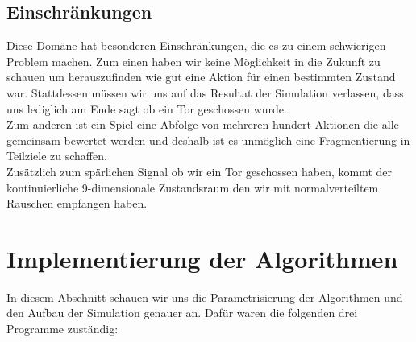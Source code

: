         \subsection{Einschränkungen}
            Diese Domäne hat besonderen Einschränkungen, die es zu einem schwierigen Problem machen. Zum einen haben wir keine Möglichkeit in die Zukunft zu schauen um herauszufinden wie gut eine Aktion für einen bestimmten Zustand war. Stattdessen müssen wir uns auf das Resultat der Simulation verlassen, dass uns lediglich am Ende sagt ob ein Tor geschossen wurde. \\[2mm]
            \noindent
            Zum anderen ist ein Spiel eine Abfolge von mehreren hundert Aktionen die alle gemeinsam bewertet werden und deshalb ist es unmöglich eine Fragmentierung in Teilziele zu schaffen. \\[2mm]
            \noindent
            Zusätzlich zum spärlichen Signal ob wir ein Tor geschossen haben, kommt der kontinuierliche 9-dimensionale Zustandsraum den wir mit normalverteiltem Rauschen empfangen haben.


\newpage

    \section{Implementierung der Algorithmen}
        In diesem Abschnitt schauen wir uns die Parametrisierung der Algorithmen und den Aufbau der Simulation genauer an. Dafür waren die folgenden drei Programme zuständig:

